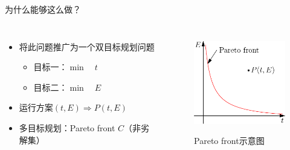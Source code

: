 \documentclass{beamer}
\begin{document}
\begin{frame}{为什么能够这么做？}
    \begin{columns}[c]
        \column{8cm}
            \begin{itemize}
              \item<1-> 将此问题推广为一个双目标规划问题
                \begin{itemize}
                  \item<2-> 目标一：$\min \quad t$
                  \item<3-> 目标二：$\min \quad E$
                \end{itemize}
              \item<4-> 运行方案$(t,E) \Longrightarrow  P(t,E)$
              \item<5-> 多目标规划：Pareto front $C$（非劣解集）
            \end{itemize}
        \column{5cm}
            \begin{figure}
              \centering
              \includegraphics[width=4.5cm]{fig/fig1/fig1.pdf}\\
              \caption{Pareto front示意图}
            \end{figure}

    \end{columns}
\end{frame}
\end{document}

